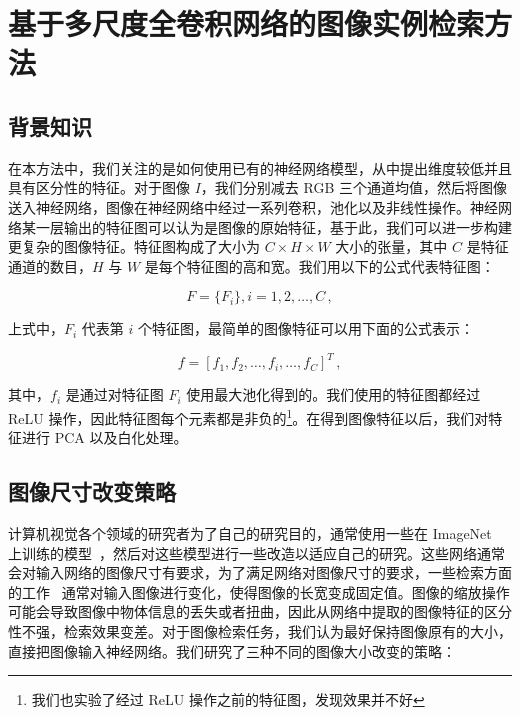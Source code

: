 \section{基于多尺度全卷积网络的图像实例检索方法}\label{sec:mfc_factor_explaination}
\subsection{背景知识}
在本方法中，我们关注的是如何使用已有的神经网络模型，从中提出维度较低并且具有区分性的特征。对于图像 $I$，我们分别减去 RGB 三个通道均值，然后将图像送入神经网络，图像在神经网络中经过一系列卷积，池化以及非线性操作。神经网络某一层输出的特征图可以认为是图像的原始特征，基于此，我们可以进一步构建更复杂的图像特征。特征图构成了大小为 $C \times H \times  W$ 大小的张量，其中 $C$ 是特征通道的数目，$H$ 与 $W$ 是每个特征图的高和宽。我们用以下的公式代表特征图：

\begin{equation}
F=\{F_i\}, i=1,2,\ldots, C\, ,
\end{equation}

上式中，$F_i$ 代表第 $i$ 个特征图，最简单的图像特征可以用下面的公式表示：

\begin{equation}\label{eq:single_scale}
f = [f_1, f_2, \ldots, f_i, \ldots, f_C]^T\, ,
\end{equation}

其中，$f_i$ 是通过对特征图 $F_i$ 使用最大池化得到的。我们使用的特征图都经过 ReLU 操作，因此特征图每个元素都是非负的\footnote{我们也实验了经过 ReLU 操作之前的特征图，发现效果并不好}。在得到图像特征以后，我们对特征进行 PCA 以及白化处理。

\subsection{图像尺寸改变策略}\label{subsec:img_resize_strategy}

计算机视觉各个领域的研究者为了自己的研究目的，通常使用一些在 ImageNet~\cite{Russakovsky2015ImageNetLS} 上训练的模型~\cite{Krizhevsky2012ImageNetCW,Simonyan2014VeryDC,Szegedy2015GoingDW,He2016DeepRL}，然后对这些模型进行一些改造以适应自己的研究。这些网络通常会对输入网络的图像尺寸有要求，为了满足网络对图像尺寸的要求，一些检索方面的工作~\cite{Gong2014MultiscaleOP,Babenko2015AggregatingLD} 通常对输入图像进行变化，使得图像的长宽变成固定值。图像的缩放操作可能会导致图像中物体信息的丢失或者扭曲，因此从网络中提取的图像特征的区分性不强，检索效果变差。对于图像检索任务，我们认为最好保持图像原有的大小，直接把图像输入神经网络。我们研究了三种不同的图像大小改变的策略：


